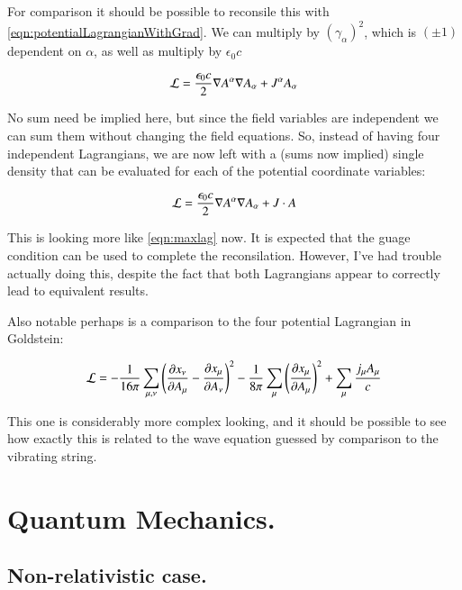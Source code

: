 \documentclass{article}
\begin{document}
For comparison it should be possible to reconsile this with
\ref{eqn:potentialLagrangianWithGrad}.  We can multiply by $(\gamma_\alpha)^2$, which is $(\pm 1)$ dependent on $\alpha$, as well as multiply by $\epsilon_0 c$

\begin{align*}
\mathcal{L} &= \frac{\epsilon_0 c}{2} \nabla {A^\alpha} \nabla {A_\alpha} + J^\alpha A_\alpha \\
\end{align*}

No sum need be implied here, but since the field variables are independent we can sum them without changing the field equations.  So, instead of having four independent Lagrangians, we are now left with a (sums now implied) single density that can be evaluated for each of the potential coordinate variables:

\begin{align*}
\mathcal{L} &= \frac{\epsilon_0 c}{2} \nabla {A^\alpha} \nabla {A_\alpha} + J \cdot A \\
\end{align*}

This is looking more like \ref{eqn:maxlag} now.  It is expected that the guage condition can be used to complete the reconsilation.  However, I've had trouble actually doing this, despite the fact that both Lagrangians appear to correctly
lead to equivalent results.

Also notable perhaps is a comparison to the four potential Lagrangian in Goldstein:

\begin{align*}
\mathcal{L} = 
-\frac{1}{16\pi} \sum_{\mu,\nu} \left( 
\frac{\partial{x_\nu}}{\partial {A_\mu}} - \frac{\partial{x_\mu}}{\partial {A_\nu}} 
\right)^2
-\frac{1}{8\pi} 
\sum_\mu
\left( 
\frac{\partial{x_\mu}}{\partial {A_\mu}}
\right)^2
+
\sum_\mu \frac{j_\mu A_\mu}{c}
\end{align*}

This one is considerably more complex looking, and 
it should be possible to see how exactly this is related to the wave
equation guessed by comparison to the vibrating string.

\section{ Quantum Mechanics. }

\subsection{ Non-relativistic case. }
\end{document}
